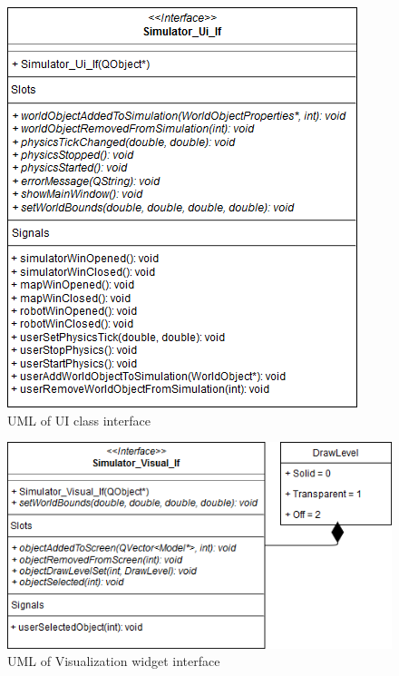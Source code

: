   \begin{figure}
 	\begin{center}
 	\includegraphics[scale=0.5]{./images_design/uml/Ui_If}
 	\caption{UML of UI class interface\label{uml:ui_if}}
 	\end{center}
 \end{figure}
 
  \begin{figure}
 	\begin{center}
 	\includegraphics[scale=0.5]{./images_design/uml/Visual_If}
 	\caption{UML of Visualization widget interface\label{uml:visual_if}}
 	\end{center}
 \end{figure}
 
